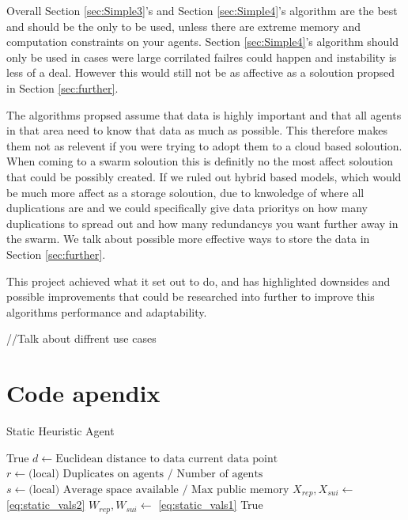 \documentclass{UoYCSproject}
\begin{document}
Overall Section \ref{sec:Simple3}'s and Section \ref{sec:Simple4}'s algorithm are the best and should be the only to be used, unless there are extreme memory and computation constraints on your agents.
Section \ref{sec:Simple4}'s algorithm should only be used in cases were large corrilated failres could happen and instability is less of a deal.
However this would still not be as affective as a soloution propsed in Section \ref{sec:further}.

The algorithms propsed assume that data is highly important and that all agents in that area need to know that data as much as possible.
This therefore makes them not as relevent if you were trying to adopt them to a cloud based soloution.
When coming to a swarm soloution this is definitly no the most affect soloution that could be possibly created.
If we ruled out hybrid based models, which would be much more affect as a storage soloution, due to knwoledge of where all duplications are and we could specifically give data prioritys on how many duplications to spread out and how many redundancys you want further away in the swarm.
We talk about possible more effective ways to store the data in Section \ref{sec:further}.

This project achieved what it set out to do, and has highlighted downsides and possible improvements that could be researched into further to improve this algorithms performance and adaptability.

//Talk about diffrent use cases



\appendix
\chapter{Code apendix}

\begin{algorithm}
\caption{Static Heuristic Agent}
\label{Agent_Control_Loop2}
\begin{algorithmic}[1]
\State {}
\State
{}
\State {}
\State \Return True
\EndIf
\State
\State $d \gets \text{Euclidean distance to data current data point}$
\State $r \gets \text{(local) Duplicates on agents / Number of agents}$
\State $s \gets \text{(local) Average space available / Max public memory}$
\State $X_{rep}, X_{sui} \gets $ \ref{eq:static_vals2}
\State $W_{rep}, W_{sui} \gets $ \ref{eq:static_vals1}
\State
{}
\State {}
\EndIf
\State
{}
\State {}
\EndIf
\State
\State {}
\State
\State \Return True
\EndProcedure
\end{algorithmic}
\end{algorithm}
\end{document}

